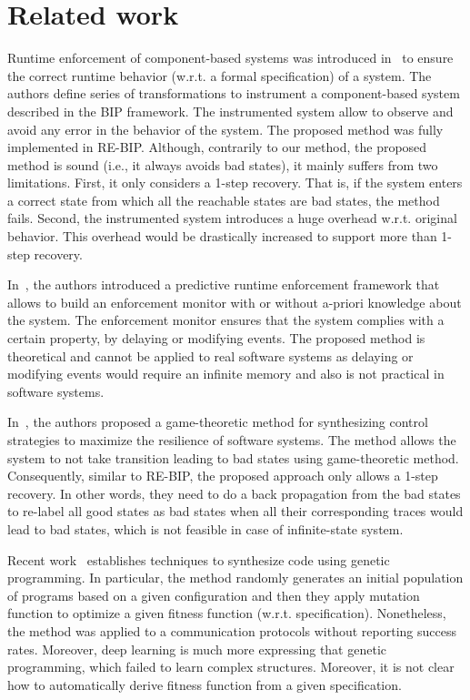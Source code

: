 \section{Related work}
Runtime enforcement of component-based systems was introduced in~\cite{CharafeddineEFJ15} to ensure the correct runtime behavior (w.r.t. a formal specification) of a system. 
The authors define series of transformations to instrument a component-based system described in the BIP framework. The instrumented system allow to observe and avoid any error in the behavior of the system. 
The proposed method was fully implemented in RE-BIP. 
Although, contrarily to our method, the proposed method is sound (i.e., it always avoids bad states), it mainly suffers from two limitations. First, it only considers a 1-step recovery. That is, if the system enters a correct state from which all the reachable states are bad states, the method fails.  Second, the instrumented system introduces a huge overhead w.r.t. original behavior. This overhead would be drastically increased to support more than 1-step recovery. 

In~\cite{PinisettyPTJFM16,PinisettyT16}, the authors introduced a predictive runtime enforcement framework that allows to build an enforcement monitor with or without a-priori knowledge about the system. 
The enforcement monitor ensures that the system complies with a certain property, by delaying or modifying events. The proposed method is theoretical and cannot be applied to real software systems as delaying or modifying events would require an infinite memory and also is not practical in software systems. 

In~\cite{HuangPSW16}, the authors proposed a game-theoretic method for synthesizing control strategies to maximize the resilience of software systems. The method allows the system to not take transition leading to bad states using game-theoretic method. Consequently,  similar to RE-BIP, the proposed approach only allows a 1-step recovery. In other words, they need to do a back propagation from the bad states to re-label all good states as bad states when all their corresponding traces would lead to bad states, which is not feasible in case of infinite-state system. 


Recent work~\cite{genetic1,genetic2,genetic3} establishes techniques to synthesize code using genetic programming.  In particular, the method randomly generates an initial population of programs based on a given configuration and then they apply mutation function to optimize a given fitness function (w.r.t. specification). Nonetheless, the method was applied to a communication protocols without reporting success rates. Moreover, deep learning is much more expressing that genetic programming, which failed to learn complex structures. Moreover, it is not clear how to automatically derive fitness function from a given specification. 

